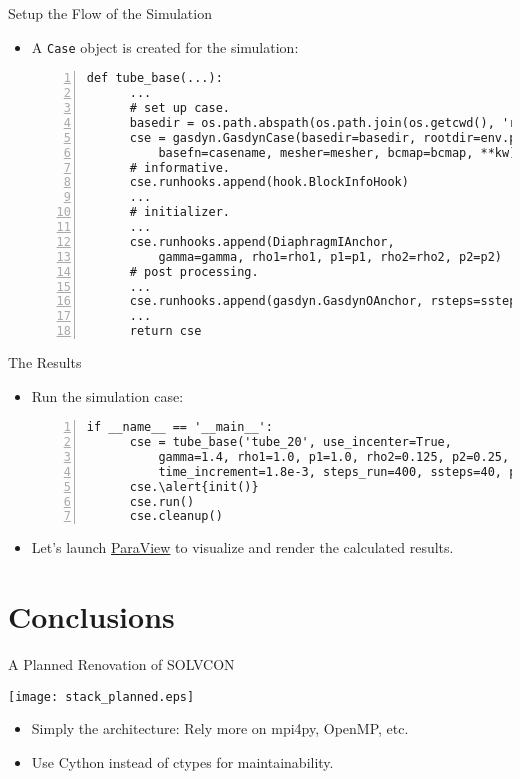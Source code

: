 \documentclass[dvips,xcolor=pst,14pt]{beamer}
\begin{document}
\begin{frame}[fragile]{
%
Setup the Flow of the Simulation
%
}
\begin{itemize} \small
  \item A \texttt{Case} object is created for the simulation:
  \begin{Verbatim}[frame=single,numbers=left,fontsize=\scriptsize]
  def tube_base(...):
      ...
      # set up case.
      basedir = os.path.abspath(os.path.join(os.getcwd(), 'result'))
      cse = gasdyn.GasdynCase(basedir=basedir, rootdir=env.projdir,
          basefn=casename, mesher=mesher, bcmap=bcmap, **kw)
      # informative.
      cse.runhooks.append(hook.BlockInfoHook)
      ...
      # initializer.
      ...
      cse.runhooks.append(DiaphragmIAnchor,
          gamma=gamma, rho1=rho1, p1=p1, rho2=rho2, p2=p2)
      # post processing.
      ...
      cse.runhooks.append(gasdyn.GasdynOAnchor, rsteps=ssteps)
      ...
      return cse
  \end{Verbatim}
\end{itemize}
\end{frame}

\begin{frame}[fragile]{
%
The Results
%
}
\begin{itemize} 
  \item Run the simulation case:
  \begin{Verbatim}[frame=single,numbers=left,fontsize=\scriptsize,commandchars=\\\{\}]
  if __name__ == '__main__':
      cse = tube_base('tube_20', use_incenter=True,
          gamma=1.4, rho1=1.0, p1=1.0, rho2=0.125, p2=0.25,
          time_increment=1.8e-3, steps_run=400, ssteps=40, psteps=1)
      cse.\alert{init()}
      cse.run()
      cse.cleanup()
  \end{Verbatim}
  \item Let's launch \href{http://paraview.org/}{ParaView} to visualize and
  render the calculated results.
\end{itemize}
\end{frame}

\section{
Conclusions
}

\begin{frame}{
%
A Planned Renovation of SOLVCON
%
}
\begin{center}
  \parbox{\textwidth}{\centering
  \texttt{[image: stack\_planned.eps]}}
\end{center}
\begin{itemize} \footnotesize
  \item Simply the architecture: Rely more on mpi4py, OpenMP, etc.
  \item Use Cython instead of ctypes for maintainability.
\end{itemize}
\end{frame}
\end{document}
